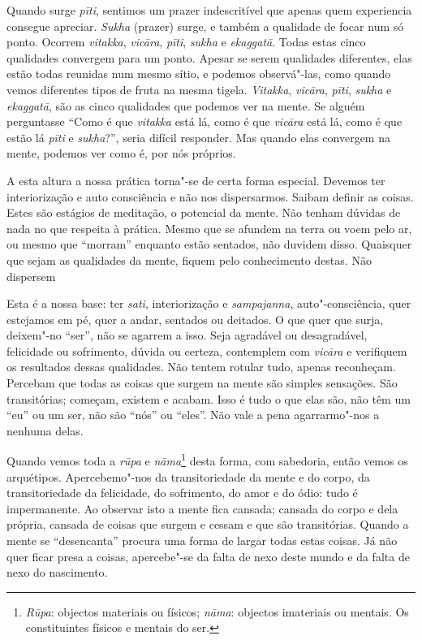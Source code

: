 Quando surge \emph{pīti}, sentimos um prazer indescritível que apenas
quem experiencia consegue apreciar. \emph{Sukha} (prazer) surge, e
também a qualidade de focar num só ponto. Ocorrem \emph{vitakka},
\emph{vicāra}, \emph{pīti}, \emph{sukha} e \emph{ekaggatā}. Todas estas
cinco qualidades convergem para um ponto. Apesar se serem qualidades
diferentes, elas estão todas reunidas num mesmo sítio, e podemos
observá"-las, como quando vemos diferentes tipos de fruta na mesma
tigela. \emph{Vitakka}, \emph{vicāra}, \emph{pīti}, \emph{sukha} e
\emph{ekaggatā}, são as cinco qualidades que podemos ver na mente. Se
alguém perguntasse ``Como é que \emph{vitakka} está lá, como é que
\emph{vicāra} está lá, como é que estão lá \emph{pīti} e
\emph{sukha}?'', seria difícil responder. Mas quando elas convergem na
mente, podemos ver como é, por nós próprios.

A esta altura a nossa prática torna"-se de certa forma especial. Devemos
ter interiorização e auto consciência e não nos dispersarmos. Saibam
definir as coisas. Estes são estágios de meditação, o potencial da
mente. Não tenham dúvidas de nada no que respeita à prática. Mesmo que
se afundem na terra ou voem pelo ar, ou mesmo que ``morram'' enquanto
estão sentados, não duvidem disso. Quaisquer que sejam as qualidades da
mente, fiquem pelo conhecimento destas. Não dispersem

Esta é a nossa base: ter \emph{sati}, interiorização e
\emph{sampajanna}, auto"-consciência, quer estejamos em pé, quer a
andar, sentados ou deitados. O que quer que surja, deixem"-no ``ser'',
não se agarrem a isso. Seja agradável ou desagradável, felicidade ou
sofrimento, dúvida ou certeza, contemplem com \emph{vicāra} e verifiquem
os resultados dessas qualidades. Não tentem rotular tudo, apenas
reconheçam. Percebam que todas as coisas que surgem na mente são simples
sensações. São transitórias; começam, existem e acabam. Isso é tudo o
que elas são, não têm um ``eu'' ou um ser, não são ``nós'' ou ``eles''.
Não vale a pena agarrarmo"-nos a nenhuma delas.

Quando vemos toda a \emph{rūpa} e \emph{nāma}\footnote{%
  \emph{Rūpa}: objectos materiais ou físicos; \emph{nāma}: objectos
  imateriais ou mentais. Os constituintes físicos e mentais do ser.
}
desta forma, com
sabedoria, então vemos os arquétipos. Apercebemo"-nos da transitoriedade
da mente e do corpo, da transitoriedade da felicidade, do sofrimento, do
amor e do ódio: tudo é impermanente. Ao observar isto a mente fica
cansada; cansada do corpo e dela própria, cansada de coisas que surgem e
cessam e que são transitórias. Quando a mente se ``desencanta'' procura
uma forma de largar todas estas coisas. Já não quer ficar presa a
coisas, apercebe"-se da falta de nexo deste mundo e da falta de nexo do
nascimento.

